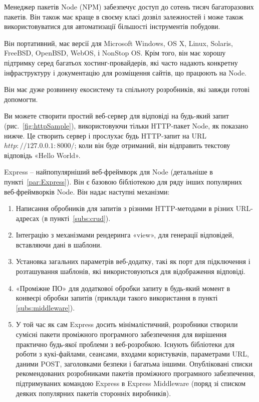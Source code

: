 Менеджер пакетів Node (NPM) забезпечує доступ до сотень тисяч багаторазових пакетів. Він також має краще в своєму класі дозвіл залежностей і може також використовуватися для автоматизації більшості інструментів побудови.

Він портативний, має версії для Microsoft Windows, OS X, Linux, Solaris, FreeBSD, OpenBSD, WebOS, і NonStop OS. Крім того, він має хорошу підтримку серед багатьох хостинг-провайдерів, які часто надають конкретну інфраструктуру і документацію для розміщення сайтів, що працюють на Node.

Він має дуже розвинену екосистему та спільноту розробників, які завжди готові допомогти.

Ви можете створити простий веб-сервер для відповіді на будь-який запит (рис.~\ref{fig:httpSample}), використовуючи тільки HTTP-пакет Node, як показано нижче. Це створить сервер і прослухає будь HTTP-запит на URL $http://127.0.0.1:8000/$; коли він буде отриманий, він відправить текстову відповідь «Hello World».


Express -- найпопулярніший веб-фреймворк для Node (детальніше в пункті~\ref{par:Express}). Він є базовою бібліотекою для ряду інших популярних веб-фреймворків Node. Він надає наступні механізми:

\begin{enumerate}
	\item Написання обробників для запитів з різними HTTP-методами в різних URL-адресах (в пункті~\ref{subs:crud}).
	\item Інтеграцію з механізмами рендеринга «view», для генерації відповідей, вставляючи дані в шаблони.
	\item Установка загальних параметрів веб-додатку, такі як порт для підключення і розташування шаблонів, які використовуються для відображення відповіді.
	\item «Проміжне ПО» для додаткової обробки запиту в будь-який момент в конвеєрі обробки запитів (приклади такого використання в пункті \ref{subs:middleware}).
	\item У той час як сам Express досить мінімалістичний, розробники створили сумісні пакети проміжного програмного забезпечення для вирішення практично будь-якої проблеми з веб-розробкою. Існують бібліотеки для роботи з кукі-файлами, сеансами, входами користувачів, параметрами URL, даними POST, заголовками безпеки і багатьма іншими. Опубліковані списки рекомендованих розробниками пакетів проміжного програмного забезпечення, підтримуваних командою Express в Express Middleware (поряд зі списком деяких популярних пакетів сторонніх виробників).
\end{enumerate}


